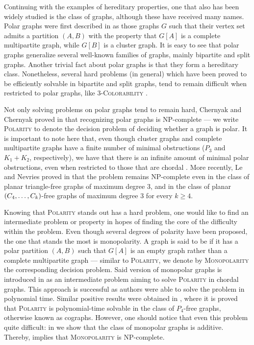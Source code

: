Continuing with the examples of hereditary properties, one that also has been
widely studied is the class of  graphs,
although these have received many names. Polar graphs were first described in
\cite{tyshkevich1985} as those graphs $G$ such that their vertex set admits a
partition $(A,B)$ with the property that $G[A]$ is a complete multipartite
graph, while $G[B]$ is a cluster graph. It is easy to see that polar graphs
generalize several well-known families of graphs, mainly bipartite and split
graphs. Another trivial fact about polar graphs is that they form a hereditary
class. Nonetheless, several hard problems (in general) which have been proved to
be efficiently solvable in bipartite and split graphs, tend to remain difficult
when restricted to polar graphs, like \textsc{3-Colorability}
\cite{barbato2021}.

Not only solving problems on polar graphs tend to remain hard, Chernyak and
Chernyak proved in \cite{chernyak1986} that recognizing polar graphs is
NP-complete --- we write \textsc{Polarity} to denote the decision problem of
deciding whether a graph is polar. It is important to note here that, even
though cluster graphs and complete multipartite graphs have a finite number of
minimal obstructions ($P_3$ and $K_1 + K_2$, respectively), we have that there
is an infinite amount of minimal polar obstructions, even when restricted to
those that are chordal \cite{chordal}. More recently, Le and Nevries proved in
\cite{Le2014} that the problem remains NP-complete even in the class of planar
triangle-free graphs of maximum degree 3, and in the class of planar
$\left(C_4,\dots,C_k\right)$-free graphs of maximum degree 3 for every $k\geq 4$.

Knowing that \textsc{Polarity} stands out has a hard problem, one would like to
find an intermediate problem or property in hopes of finding the core of the
difficulty within the problem. Even though several degrees of polarity have been
proposed, the one that stands the most is monopolarity. A graph is said to be
 if it has a polar partition
$(A,B)$ such that $G[A]$ is an empty graph rather than a complete multipartite
graph --- similar to \textsc{Polarity}, we denote by \textsc{Monopolarity} the
corresponding decision problem. Said version of monopolar graphs is introduced
in \cite{chordal} as an intermediate problem aiming to solve \textsc{Polarity}
in chordal graphs. This approach is successful as authors were able to solve the
problem in polynomial time. Similar positive results were obtained in
\cite{ekim2008}, where it is proved that \textsc{Polarity} is polynomial-time
solvable in the class of $P_4$-free graphs, otherwise known as cographs.
However, one should notice that even this problem quite difficult: in
 we show that the class of monopolar graphs is additive.
Thereby,  implies that \textsc{Monopolarity} is NP-complete.

